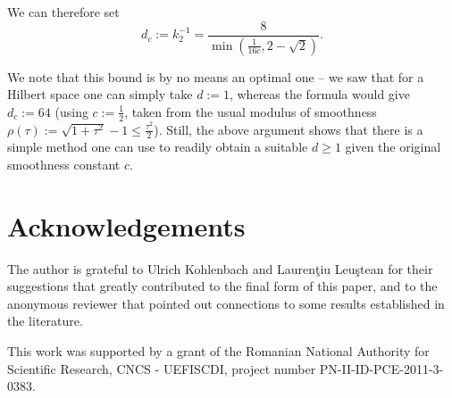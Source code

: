 \documentclass{article}
\begin{document}
We can therefore set
$$d_c := k_2^{-1} = \frac{8}{\min\left(\frac{1}{16c},2-\sqrt{2}\right)}.$$

We note that this bound is by no means an optimal one -- we saw that for a Hilbert space one can simply take $d:=1$, whereas the formula would give $d_c := 64$ (using $c:= \frac{1}{2}$, taken from the usual modulus of smoothness $\rho(\tau):=\sqrt{1+\tau^2}-1 \leq \frac{\tau^2}{2}$). Still, the above argument shows that there is a simple method one can use to readily obtain a suitable $d \geq 1$ given the original smoothness constant $c$.

\section{Acknowledgements}

The author is grateful to Ulrich Kohlenbach and Lauren\c tiu Leu\c stean for their suggestions that greatly contributed to the final form of this paper, and to the anonymous reviewer that pointed out connections to some results established in the literature.

This work was supported by a grant of the Romanian National Authority for Scientific Research, CNCS - UEFISCDI, project number PN-II-ID-PCE-2011-3-0383.
\end{document}
